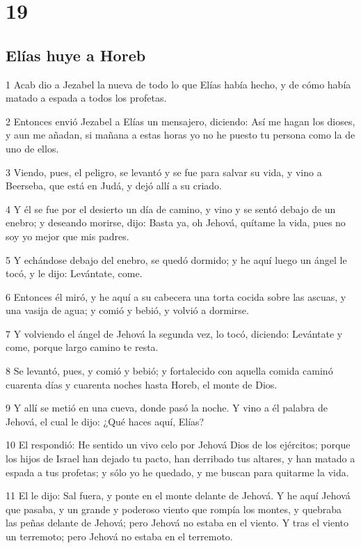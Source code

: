 \chapter{19}

\section*{Elías huye a Horeb}

\par 1 Acab dio a Jezabel la nueva de todo lo que Elías había hecho, y de cómo había matado a espada a todos los profetas.
\par 2 Entonces envió Jezabel a Elías un mensajero, diciendo: Así me hagan los dioses, y aun me añadan, si mañana a estas horas yo no he puesto tu persona como la de uno de ellos.
\par 3 Viendo, pues, el peligro, se levantó y se fue para salvar su vida, y vino a Beerseba, que está en Judá, y dejó allí a su criado.
\par 4 Y él se fue por el desierto un día de camino, y vino y se sentó debajo de un enebro; y deseando morirse, dijo: Basta ya, oh Jehová, quítame la vida, pues no soy yo mejor que mis padres.
\par 5 Y echándose debajo del enebro, se quedó dormido; y he aquí luego un ángel le tocó, y le dijo: Levántate, come.
\par 6 Entonces él miró, y he aquí a su cabecera una torta cocida sobre las ascuas, y una vasija de agua; y comió y bebió, y volvió a dormirse.
\par 7 Y volviendo el ángel de Jehová la segunda vez, lo tocó, diciendo: Levántate y come, porque largo camino te resta.
\par 8 Se levantó, pues, y comió y bebió; y fortalecido con aquella comida caminó cuarenta días y cuarenta noches hasta Horeb, el monte de Dios.
\par 9 Y allí se metió en una cueva, donde pasó la noche. Y vino a él palabra de Jehová, el cual le dijo: ¿Qué haces aquí, Elías?
\par 10 El respondió: He sentido un vivo celo por Jehová Dios de los ejércitos; porque los hijos de Israel han dejado tu pacto, han derribado tus altares, y han matado a espada a tus profetas; y sólo yo he quedado, y me buscan para quitarme la vida. 
\par 11 El le dijo: Sal fuera, y ponte en el monte delante de Jehová. Y he aquí Jehová que pasaba, y un grande y poderoso viento que rompía los montes, y quebraba las peñas delante de Jehová; pero Jehová no estaba en el viento. Y tras el viento un terremoto; pero Jehová no estaba en el terremoto.
